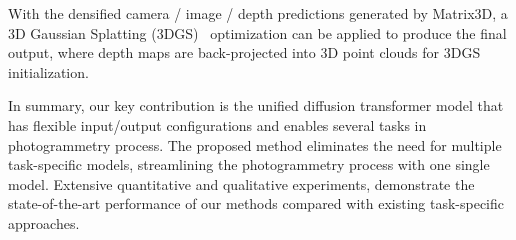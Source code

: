 With the densified camera / image / depth predictions generated by Matrix3D, a 3D Gaussian Splatting (3DGS)~\cite{kerbl20233d} optimization can be applied to produce the final output, where depth maps are back-projected into 3D point clouds for 3DGS initialization.

In summary, our key contribution is the unified diffusion transformer model that has flexible input/output configurations and enables several tasks in photogrammetry process. The proposed method eliminates the need for multiple task-specific models, streamlining the photogrammetry process with one single model. Extensive quantitative and qualitative experiments, demonstrate the state-of-the-art performance of our methods compared with existing task-specific approaches.